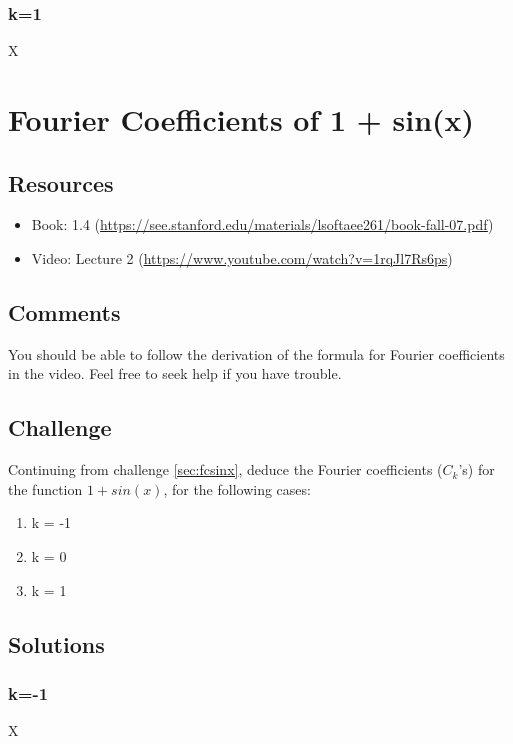 \subsubsection{k=1}
X






\newpage

\section{Fourier Coefficients of 1 + sin(x)}

\subsection*{Resources}
\begin{itemize}
    \item Book: 1.4 (\url{https://see.stanford.edu/materials/lsoftaee261/book-fall-07.pdf})
    \item Video: Lecture 2 (\url{https://www.youtube.com/watch?v=1rqJl7Rs6ps})
\end{itemize}

\subsection*{Comments}
You should be able to follow the derivation of the formula for Fourier coefficients in the video. Feel free to seek help if you have trouble.

\subsection*{Challenge}
Continuing from challenge \ref{sec:fcsinx}, deduce the Fourier coefficients ($C_k$'s) for the function $1+sin(x)$, for the following cases:
\begin{enumerate}
    \item k = -1
    \item k = 0
    \item k = 1
\end{enumerate}

\subsection*{Solutions}
\subsubsection{k=-1}
X

